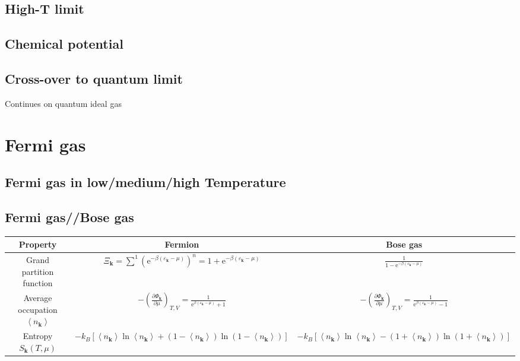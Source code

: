 \documentclass[12pt,a4paper]{article}
\begin{document}
\subsection{High-T limit}
\subsection{Chemical potential}

\subsection{Cross-over to quantum limit}
Continues on quantum ideal gas
\section{Fermi gas}
\subsection{Fermi gas in low/medium/high Temperature}
\subsection{Fermi gas//Bose gas}
\begin{center}
    \begin{tabularx}{\linewidth}{c|c|c}
        Property & Fermion & Bose gas  \\
        \hline
        Grand partition function & $\Xi_{\mathbf{k}}=\sum^1\left(\mathrm{e}^{-\beta\left(\varepsilon_{\mathbf{k}}-\mu\right)}\right)^n=1+\mathrm{e}^{-\beta\left(\varepsilon_{\mathbf{k}}-\mu\right)}$ & $\frac{1}{1-\mathrm{e}^{-\beta\left(\varepsilon_{\mathbf{k}}-\mu\right)}}$ \\
        Average occupation$\left\langle n_{\mathbf{k}}\right\rangle$ & $-\left(\frac{\partial \Phi_{\mathbf{k}}}{\partial \mu}\right)_{T, V}=\frac{1}{\mathrm{e}^{\beta\left(\varepsilon_{\mathbf{k}}-\mu\right)}+1}$ & $-\left(\frac{\partial \Phi_{\mathbf{k}}}{\partial \mu}\right)_{T, V}=\frac{1}{\mathrm{e}^{\beta\left(\varepsilon_{\mathbf{k}}-\mu\right)}-1}$ \\
        Entropy $S_{\mathbf{k}}(T, \mu)$& $ -k_B\left[\left\langle n_{\mathbf{k}}\right\rangle \ln \left\langle n_{\mathbf{k}}\right\rangle+\left(1-\left\langle n_{\mathbf{k}}\right\rangle\right) \ln \left(1-\left\langle n_{\mathbf{k}}\right\rangle\right)\right]$ & $-k_B\left[\left\langle n_{\mathbf{k}}\right\rangle \ln \left\langle n_{\mathbf{k}}\right\rangle-\left(1+\left\langle n_{\mathbf{k}}\right\rangle\right) \ln \left(1+\left\langle n_{\mathbf{k}}\right\rangle\right)\right]$ 
    \end{tabularx}    
\end{center}
\end{document}
